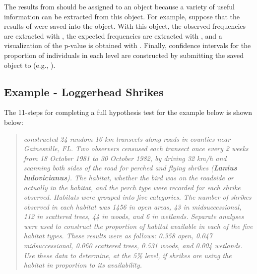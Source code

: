\documentclass[10pt,openany]{book}\usepackage[]{graphicx}\usepackage[]{color}
\begin{document}

\vspace{-12pt}

The results from  should be assigned to an object because a variety of useful information can be extracted from this object.  For example, suppose that the results of  were saved into the  object.  With this object, the observed frequencies are extracted with , the expected frequencies are extracted with , and a visualization of the p-value is obtained with .  Finally, confidence intervals for the proportion of individuals in each level are constructed by submitting the saved object to  (e.g., ).


\subsection{Example - Loggerhead Shrikes}
The 11-steps  for completing a full hypothesis test for the example below is shown below:

\begin{quote}
\textsl{\cite{BohallWood1987} constructed 24 random 16-km transects along roads in counties near Gainesville, FL.  Two observers censused each transect once every 2 weeks from 18 October 1981 to 30 October 1982, by driving 32 km/h and scanning both sides of the road for perched and flying shrikes (\textbf{Lanius ludovicianus}).  The habitat, whether the bird was on the roadside or actually in the habitat, and the perch type were recorded for each shrike observed.  Habitats were grouped into five categories.  The number of shrikes observed in each habitat was 1456 in open areas, 43 in midsuccessional, 112 in scattered trees, 44 in woods, and 6 in wetlands.  Separate analyses were used to construct the proportion of habitat available in each of the five habitat types.  These results were as follows: 0.358 open, 0.047 midsuccessional, 0.060 scattered trees, 0.531 woods, and 0.004 wetlands.  Use these data to determine, at the 5\% level, if shrikes are using the habitat in proportion to its availability.}
\end{quote}
\end{document}
